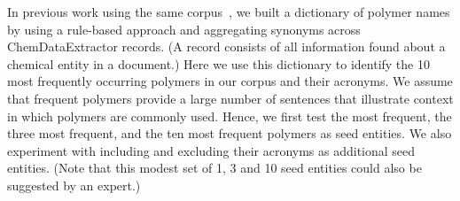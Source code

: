 In previous work using the same corpus~\cite{tchoua2016hybrid,tchoua2016hybridi}, 
we built a dictionary of polymer names by using a rule-based approach and aggregating synonyms across ChemDataExtractor records. (A record consists of all information found about a chemical entity in a document.)  
Here we use this dictionary to identify the 10 most frequently occurring polymers in our corpus and their acronyms.
We assume that frequent polymers provide a large number of sentences that illustrate context in which polymers are commonly used.
Hence, we first test the most frequent, the three most frequent, and the ten most frequent polymers as seed entities.
We also experiment with including and excluding their acronyms as additional seed entities.
(Note that this modest set of 1, 3 and 10 seed entities could also be suggested by an expert.)


